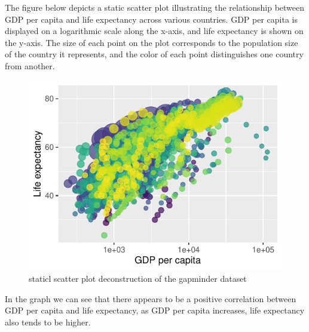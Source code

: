 \documentclass{article}\usepackage[]{graphicx}\usepackage[]{xcolor}
\makeatletter
\def\maxwidth{ %
  \ifdim\Gin@nat@width>\linewidth
    \linewidth
  \else
    \Gin@nat@width
  \fi
}
\newenvironment{knitrout}{}{} %
\numberwithin{equation}{section}
\makeatother
\begin{document}
\noindent
The figure below depicts a static scatter plot illustrating the relationship between GDP per capita and life expectancy across various countries. GDP per capita is displayed on a logarithmic scale along the x-axis, and life expectancy is shown on the y-axis. The size of each point on the plot corresponds to the population size of the country it represents, and the color of each point distinguishes one country from another.\\

\begin{knitrout}\scriptsize
{}\color{fgcolor}\begin{figure}[H]

{\centering \includegraphics[width=\maxwidth]{figure/beamer-gapminder_static-1} 

}

\caption[staticl scatter plot deconstruction of the gapminder dataset]{staticl scatter plot deconstruction of the gapminder dataset}\label{fig:gapminder_static}
\end{figure}

\end{knitrout}
\noindent
In the graph we can see that there appears to be a positive correlation between GDP per capita and life expectancy, as GDP per capita increases, life expectancy also tends to be higher. \\
\end{document}
